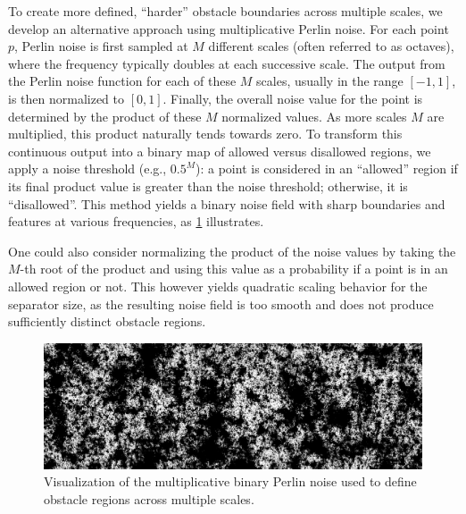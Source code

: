 To create more defined, \enquote{harder} obstacle boundaries across multiple scales, we develop an alternative approach using multiplicative Perlin noise.
For each point \(p\), Perlin noise is first sampled at \(M\) different scales (often referred to as octaves), where the frequency typically doubles at each successive scale.
The output from the Perlin noise function for each of these \(M\) scales, usually in the range \([-1, 1]\), is then normalized to \([0, 1]\).
Finally, the overall noise value for the point is determined by the product of these \(M\) normalized values.
As more scales \(M\) are multiplied, this product naturally tends towards zero.
To transform this continuous output into a binary map of allowed versus disallowed regions, we apply a noise threshold (e.g., \(0.5^M\)): a point is considered in an \enquote{allowed} region if its final product value is greater than the noise threshold; otherwise, it is \enquote{disallowed}.
This method yields a binary noise field with sharp boundaries and features at various frequencies, as \cref{fig:multiplicative_binary_noise_viz} illustrates.

One could also consider normalizing the product of the noise values by taking the \(M\)-th root of the product and using this value as a probability if a point is in an allowed region or not.
This however yields quadratic scaling behavior for the separator size, as the resulting noise field is too smooth and does not produce sufficiently distinct obstacle regions.

\begin{figure}[tbhp]
	\centering
	\includegraphics[width=\linewidth]{graphics/noise_image.png}
	\caption{Visualization of the multiplicative binary Perlin noise used to define obstacle regions across multiple scales.}
	\label{fig:multiplicative_binary_noise_viz}
\end{figure}

